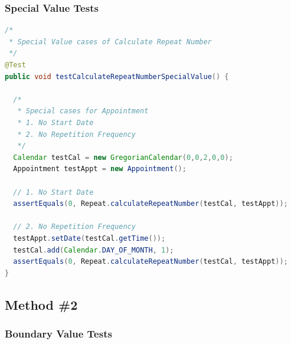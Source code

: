 \subsubsection{Special Value Tests}\label{special-value-tests}

\begin{lstlisting}[language=Java]
/*
 * Special Value cases of Calculate Repeat Number
 */
@Test
public void testCalculateRepeatNumberSpecialValue() {

  /*
   * Special cases for Appointment
   * 1. No Start Date
   * 2. No Repetition Frequency
   */
  Calendar testCal = new GregorianCalendar(0,0,2,0,0);
  Appointment testAppt = new Appointment();

  // 1. No Start Date
  assertEquals(0, Repeat.calculateRepeatNumber(testCal, testAppt));

  // 2. No Repetition Frequency
  testAppt.setDate(testCal.getTime());
  testCal.add(Calendar.DAY_OF_MONTH, 1);
  assertEquals(0, Repeat.calculateRepeatNumber(testCal, testAppt));
}
\end{lstlisting}

\subsection{Method \#2}\label{method-2}

\subsubsection{Boundary Value Tests}\label{boundary-value-tests-1}

